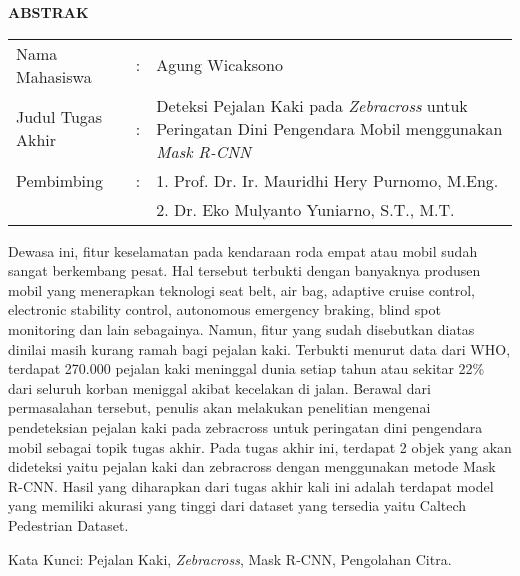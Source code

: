 \begin{center}
  \large\textbf{ABSTRAK}
\end{center}


\vspace{2ex}

\begingroup
  \setlength{\tabcolsep}{0pt}

  \noindent
  \begin{tabularx}{\textwidth}{l >{\centering}m{2em} X}
    Nama Mahasiswa    &:& Agung Wicaksono \\

    Judul Tugas Akhir &:&	Deteksi Pejalan Kaki pada \textit{Zebracross} untuk Peringatan Dini Pengendara Mobil menggunakan \textit{Mask R-CNN} \\

    Pembimbing        &:& 1. Prof. Dr. Ir. Mauridhi Hery Purnomo, M.Eng. \\
                      & & 2. Dr. Eko Mulyanto Yuniarno, S.T., M.T. \\
  \end{tabularx}
\endgroup

Dewasa ini, fitur keselamatan pada kendaraan roda empat atau mobil sudah sangat berkembang pesat. Hal tersebut terbukti dengan banyaknya produsen mobil yang menerapkan teknologi seat belt, air bag, adaptive cruise control, electronic stability control, autonomous emergency braking, blind spot monitoring dan lain sebagainya. Namun, fitur yang sudah disebutkan diatas dinilai masih kurang ramah bagi pejalan kaki. Terbukti menurut data dari WHO, terdapat 270.000 pejalan kaki meninggal dunia setiap tahun atau sekitar 22\% dari seluruh korban meniggal akibat kecelakan di jalan. Berawal dari permasalahan tersebut, penulis akan melakukan penelitian mengenai pendeteksian pejalan kaki pada zebracross untuk peringatan dini pengendara mobil sebagai topik tugas akhir. Pada tugas akhir ini, terdapat 2 objek yang akan dideteksi yaitu pejalan kaki dan zebracross dengan menggunakan metode Mask R-CNN. Hasil yang diharapkan dari tugas akhir kali ini adalah terdapat model yang memiliki akurasi yang tinggi dari dataset yang tersedia yaitu Caltech Pedestrian Dataset.

Kata Kunci: Pejalan Kaki, \emph{Zebracross}, Mask R-CNN, Pengolahan Citra.
